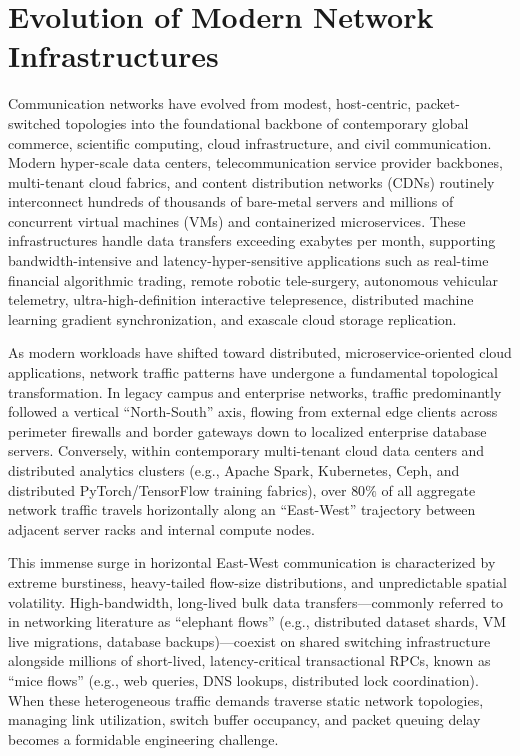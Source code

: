 \documentclass[12pt,a4paper,oneside]{report}
\begin{document}
\section{Evolution of Modern Network Infrastructures}
Communication networks have evolved from modest, host-centric, packet-switched topologies into the foundational backbone of contemporary global commerce, scientific computing, cloud infrastructure, and civil communication. Modern hyper-scale data centers, telecommunication service provider backbones, multi-tenant cloud fabrics, and content distribution networks (CDNs) routinely interconnect hundreds of thousands of bare-metal servers and millions of concurrent virtual machines (VMs) and containerized microservices. These infrastructures handle data transfers exceeding exabytes per month, supporting bandwidth-intensive and latency-hyper-sensitive applications such as real-time financial algorithmic trading, remote robotic tele-surgery, autonomous vehicular telemetry, ultra-high-definition interactive telepresence, distributed machine learning gradient synchronization, and exascale cloud storage replication.

As modern workloads have shifted toward distributed, microservice-oriented cloud applications, network traffic patterns have undergone a fundamental topological transformation. In legacy campus and enterprise networks, traffic predominantly followed a vertical ``North-South'' axis, flowing from external edge clients across perimeter firewalls and border gateways down to localized enterprise database servers. Conversely, within contemporary multi-tenant cloud data centers and distributed analytics clusters (e.g., Apache Spark, Kubernetes, Ceph, and distributed PyTorch/TensorFlow training fabrics), over $80\%$ of all aggregate network traffic travels horizontally along an ``East-West'' trajectory between adjacent server racks and internal compute nodes.

This immense surge in horizontal East-West communication is characterized by extreme burstiness, heavy-tailed flow-size distributions, and unpredictable spatial volatility. High-bandwidth, long-lived bulk data transfers---commonly referred to in networking literature as ``elephant flows'' (e.g., distributed dataset shards, VM live migrations, database backups)---coexist on shared switching infrastructure alongside millions of short-lived, latency-critical transactional RPCs, known as ``mice flows'' (e.g., web queries, DNS lookups, distributed lock coordination). When these heterogeneous traffic demands traverse static network topologies, managing link utilization, switch buffer occupancy, and packet queuing delay becomes a formidable engineering challenge.
\end{document}
